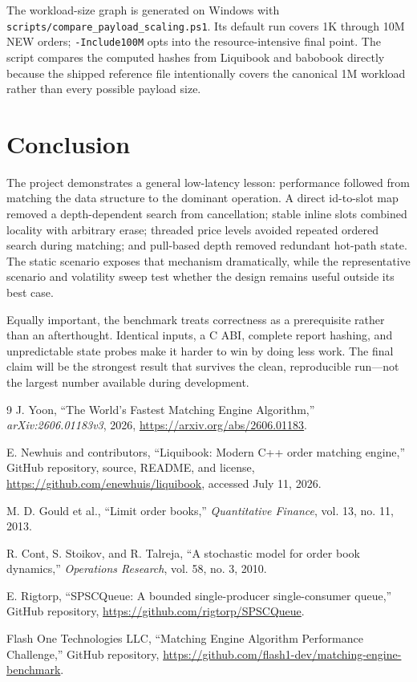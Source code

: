 \documentclass[10pt,twocolumn]{article}
\begin{document}
The workload-size graph is generated on Windows with
\texttt{scripts/compare\_payload\_scaling.ps1}.  Its default run covers 1K through
10M NEW orders; \texttt{-Include100M} opts into the resource-intensive final
point.  The script compares the computed hashes from Liquibook and babobook
directly because the shipped reference file intentionally covers the canonical
1M workload rather than every possible payload size.

\section{Conclusion}

The project demonstrates a general low-latency lesson: performance followed from
matching the data structure to the dominant operation.  A direct id-to-slot map
removed a depth-dependent search from cancellation; stable inline slots combined
locality with arbitrary erase; threaded price levels avoided repeated ordered
search during matching; and pull-based depth removed redundant hot-path state.
The static scenario exposes that mechanism dramatically, while the representative
scenario and volatility sweep test whether the design remains useful outside its
best case.

Equally important, the benchmark treats correctness as a prerequisite rather
than an afterthought.  Identical inputs, a C ABI, complete report hashing, and
unpredictable state probes make it harder to win by doing less work.  The final
claim will be the strongest result that survives the clean, reproducible run---not
the largest number available during development.

\begin{thebibliography}{9}
\small
{}
J. Yoon, ``The World's Fastest Matching Engine Algorithm,''
\textit{arXiv:2606.01183v3}, 2026,
\url{https://arxiv.org/abs/2606.01183}.

E. Newhuis and contributors, ``Liquibook: Modern C++ order matching engine,''
GitHub repository, source, README, and license,
\url{https://github.com/enewhuis/liquibook}, accessed July 11, 2026.

M. D. Gould et al., ``Limit order books,'' \textit{Quantitative Finance},
vol. 13, no. 11, 2013.

R. Cont, S. Stoikov, and R. Talreja, ``A stochastic model for order book
dynamics,'' \textit{Operations Research}, vol. 58, no. 3, 2010.

E. Rigtorp, ``SPSCQueue: A bounded single-producer single-consumer queue,''
GitHub repository, \url{https://github.com/rigtorp/SPSCQueue}.

Flash One Technologies LLC, ``Matching Engine Algorithm Performance
Challenge,'' GitHub repository,
\url{https://github.com/flash1-dev/matching-engine-benchmark}.
\end{thebibliography}
\end{document}
